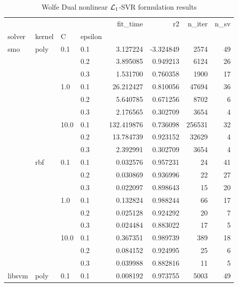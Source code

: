 \begin{table}[H]
\centering
\caption{Wolfe Dual nonlinear $\protect \mathcal{L}_1$-SVR formulation results}
\label{nonlinear_dual_l1_svr_cv_results}
\begin{tabular}{llllrrrr}
\toprule
       &     &      &     &    fit\_time &        r2 &  n\_iter &  n\_sv \\
solver & kernel & C & epsilon &             &           &         &       \\
\midrule
smo & poly & 0.1  & 0.1 &    3.127224 & -3.324849 &    2574 &    49 \\
       &     &      & 0.2 &    3.895085 &  0.949213 &    6124 &    26 \\
       &     &      & 0.3 &    1.531700 &  0.760358 &    1900 &    17 \\
       &     & 1.0  & 0.1 &   26.212427 &  0.810056 &   47694 &    36 \\
       &     &      & 0.2 &    5.640785 &  0.671256 &    8702 &     6 \\
       &     &      & 0.3 &    2.176565 &  0.302709 &    3654 &     4 \\
       &     & 10.0 & 0.1 &  132.419876 &  0.736098 &  256531 &    32 \\
       &     &      & 0.2 &   13.784739 &  0.923152 &   32629 &     4 \\
       &     &      & 0.3 &    2.392991 &  0.302709 &    3654 &     4 \\
       & rbf & 0.1  & 0.1 &    0.032576 &  0.957231 &      24 &    41 \\
       &     &      & 0.2 &    0.030869 &  0.936996 &      22 &    27 \\
       &     &      & 0.3 &    0.022097 &  0.898643 &      15 &    20 \\
       &     & 1.0  & 0.1 &    0.132824 &  0.988244 &      66 &    17 \\
       &     &      & 0.2 &    0.025128 &  0.924292 &      20 &     7 \\
       &     &      & 0.3 &    0.024484 &  0.883022 &      17 &     5 \\
       &     & 10.0 & 0.1 &    0.367351 &  0.989739 &     389 &    18 \\
       &     &      & 0.2 &    0.084152 &  0.924995 &      25 &     6 \\
       &     &      & 0.3 &    0.039988 &  0.882816 &      11 &     5 \\
libsvm & poly & 0.1  & 0.1 &    0.008192 &  0.973755 &    5003 &    49 \\

\end{tabular}
\end{table}
